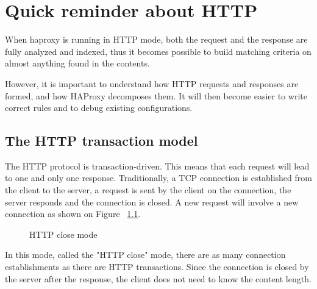 \chapter{Quick reminder about HTTP}
When haproxy is running in HTTP mode, both the request and the response are
fully analyzed and indexed, thus it becomes possible to build matching criteria
on almost anything found in the contents.

However, it is important to understand how HTTP requests and responses are
formed, and how HAProxy decomposes them. It will then become easier to write
correct rules and to debug existing configurations.

\section{The HTTP transaction model}
The HTTP protocol is transaction-driven. This means that each request will lead
to one and only one response. Traditionally, a TCP connection is established
from the client to the server, a request is sent by the client on the
connection, the server responds and the connection is closed. A new request
will involve a new connection as shown on Figure ~\ref{fig:http_close}.

\begin{figure}[!h]
\centering
{}

\caption{HTTP close mode}
\label{fig:http_close}
\end{figure}

In this mode, called the "HTTP close" mode, there are as many connection
establishments as there are HTTP transactions. Since the connection is closed
by the server after the response, the client does not need to know the content
length.

